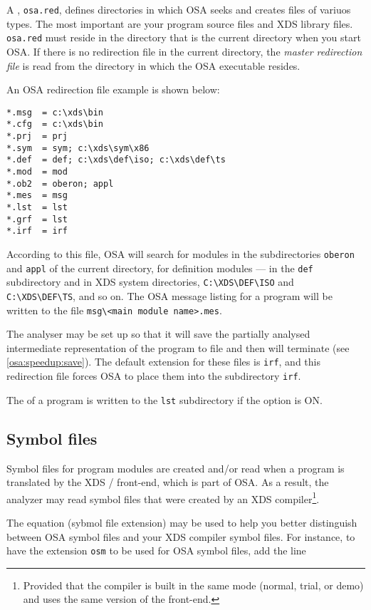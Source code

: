 A , \verb'osa.red', defines directories
in which OSA seeks and creates files of variuos types. The most important
are your program source files and XDS library files. \verb'osa.red' must 
reside in the directory that is the current directory when you start OSA.
If there is no redirection file in the current directory,
the {\it master redirection file} is read from
the directory in which the OSA executable resides.

An OSA redirection file example is shown below:

\begin{verbatim}
*.msg  = c:\xds\bin
*.cfg  = c:\xds\bin
*.prj  = prj 
*.sym  = sym; c:\xds\sym\x86
*.def  = def; c:\xds\def\iso; c:\xds\def\ts
*.mod  = mod
*.ob2  = oberon; appl
*.mes  = msg
*.lst  = lst
*.grf  = lst
*.irf  = irf
\end{verbatim}

According to this file, OSA will search for \ot{} modules 
in the subdirectories \verb'oberon' and \verb'appl' of the current directory, 
for \mt{} definition modules --- in the \verb'def' subdirectory 
and in XDS system directories, \verb'C:\XDS\DEF\ISO' and \verb'C:\XDS\DEF\TS',
and so on. The OSA message listing for a program will be written to the
file \verb'msg\<main module name>.mes'.

The analyser may be set up so that it will save the partially analysed
intermediate representation of the program to file and then will
terminate (see \ref{osa:speedup:save}). The default extension for these 
files is \verb'irf', and this redirection file forces OSA to place
them into the subdirectory \verb'irf'.

The  of a program is written to 
the \verb'lst' subdirectory if the option  is ON.

\subsection{Symbol files}
\label{osa:env:sym}

Symbol files for program modules are created and/or read when a program is
translated by the XDS \mt{}/\ot{} front-end, which is part of OSA.
As a result, the analyzer may read symbol files that were created by an
XDS compiler\footnote{Provided that the compiler is built in the same mode
(normal, trial, or demo) and uses the same version of the front-end.}.

The equation  (sybmol file extension)
may be used to help you better distinguish between OSA symbol 
files and your XDS compiler symbol files. For instance, to
have the extension \verb'osm' to be used for OSA symbol files,
add the line

